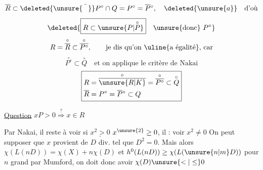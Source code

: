 \[
 \overline R\subset\deleted{\unsure{\bar{\phantom P}}}P^\circ\cap Q=P^\circ=\overline P{}^\circ,\quad\deleted{\unsure{a}}\quad\text{d'où}
\]
\[
 \deleted{\boxed{R\subset\unsure{P|\overset{\circ}{P}}}\quad\unsure{\text{donc}}\ P^\circ}
\]
\[
 R=\overset{\circ}{\overline R}\subset\overset{\circ}{\overline{P^\circ}},
 \qquad\text{je dis qu'on \uline{a égalité}, car}
\]
\[
 \overset{\circ}{P^\circ}\subset\overset{\circ}{Q}\quad\text{et on applique le critère de Nakai}
\]
\[
 \boxed{\begin{aligned}
 R&=\overset{\circ}{\overline{\unsure{R|K}}}=\overset{\circ}{\overline{P^\circ}}\subset\overset{\circ}{Q}\\
 \overline R&=P^\circ=\overline P{}^\circ\subset Q
 \end{aligned}}
\]

\uline{Question} \quad $xP>0\overset{?}{\Longrightarrow}x\in R$

Par Nakai, il reste à voir si $\underline{x^2>0}$  $x^{\unsure{2}}\geq0$, il  : voir $x^2\ne0$ On peut supposer que $x$ provient de $D$ div. tel que $D^2=0$. Mais alors $\chi(L(nD))=\chi(X)+n\chi(D)$ et $h^0(L(nD))\geq\chi(L(\unsure{n|m}D))$ pour $n$ grand par Mumford, on doit donc avoir $\chi(D)\unsure{<|\leq}0$

